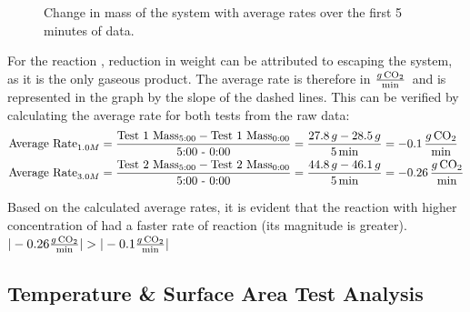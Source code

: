 \begin{figure}[H]
    \caption{Change in mass of the system with average rates over the first 5 minutes of data.}
\end{figure}
For the reaction \reactionOne, reduction in weight can be attributed to  escaping the system, as it is the only gaseous product. The average rate is therefore in $\defunits$~and is represented in the graph by the slope of the dashed lines. This can be verified by calculating the average rate for both tests from the raw data:
\begin{align*}
    \text{Average Rate}_{1.0M} &= \frac{\text{Test 1 Mass}_{5:00} - \text{Test 1 Mass}_{0:00}}{\text{5:00 - 0:00}} =\frac{27.8 \, g - 28.5 \, g}{5 \, \text{min}} = -0.1 \, \defunits \\
    \text{Average Rate}_{3.0M} &= \frac{\text{Test 2 Mass}_{5:00} - \text{Test 2 Mass}_{0:00}}{\text{5:00 - 0:00}} = \frac{44.8 \, g - 46.1 \, g}{5 \, \text{min}} = -0.26 \, \defunits
\end{align*}

Based on the calculated average rates, it is evident that the reaction with higher concentration of  had a faster rate of reaction (its magnitude is greater). $ |-0.26 \defunits| > |-0.1 \defunits| $ 

\subsection{Temperature \& Surface Area Test Analysis}


